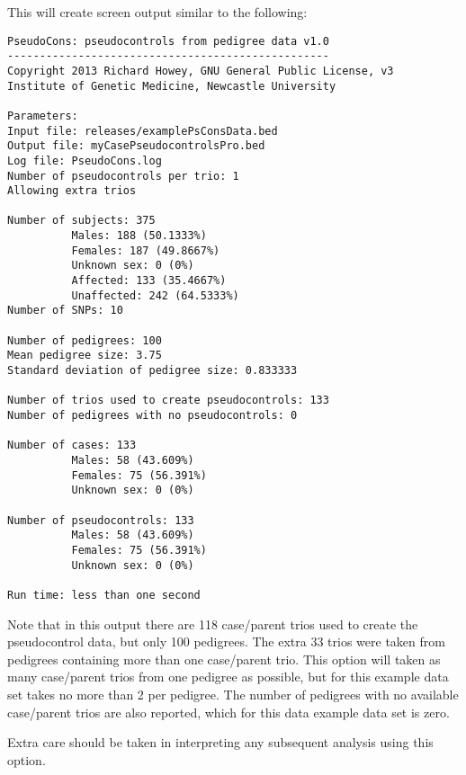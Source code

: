 \documentclass[a4paper,12pt]{article}
\begin{document}
This will create screen output similar to the following: 
\begin{verbatim}
PseudoCons: pseudocontrols from pedigree data v1.0
--------------------------------------------------
Copyright 2013 Richard Howey, GNU General Public License, v3
Institute of Genetic Medicine, Newcastle University

Parameters:
Input file: releases/examplePsConsData.bed
Output file: myCasePseudocontrolsPro.bed
Log file: PseudoCons.log
Number of pseudocontrols per trio: 1
Allowing extra trios

Number of subjects: 375
          Males: 188 (50.1333%)
          Females: 187 (49.8667%)
          Unknown sex: 0 (0%)
          Affected: 133 (35.4667%)
          Unaffected: 242 (64.5333%)
Number of SNPs: 10

Number of pedigrees: 100
Mean pedigree size: 3.75
Standard deviation of pedigree size: 0.833333

Number of trios used to create pseudocontrols: 133
Number of pedigrees with no pseudocontrols: 0

Number of cases: 133
          Males: 58 (43.609%)
          Females: 75 (56.391%)
          Unknown sex: 0 (0%)

Number of pseudocontrols: 133
          Males: 58 (43.609%)
          Females: 75 (56.391%)
          Unknown sex: 0 (0%)

Run time: less than one second
\end{verbatim}

Note that in this output there are 118 case/parent trios used to create the pseudocontrol data, but only 100 pedigrees. The extra 33 trios were taken from pedigrees containing more than one case/parent trio. This option will taken as many case/parent trios from one pedigree as possible, but for this example data set takes no more than 2 per pedigree. The number of pedigrees with no available case/parent trios are also reported, which for this data example data set is zero. 

Extra care should be taken in interpreting any subsequent analysis using this option. 






\end{document}
